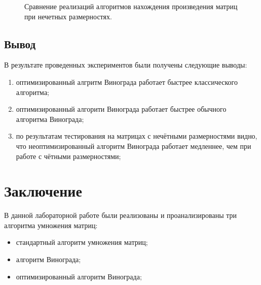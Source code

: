 \documentclass[a4paper]{article}
\begin{document}
	\begin{figure}[h]
	\caption{Сравнение реализаций алгоритмов нахождения произведения матриц при нечетных размерностях.\centering}
	\label{image2}
	\end{figure}
	\clearpage
	
	
	\subsection{Вывод}
	В результате проведенных экспериментов были получены следующие выводы:
	\begin{enumerate}
		\item оптимизированный алгритм Винограда работает быстрее классического алгоритма;
		\item оптимизированный алгорити Винограда работает быстрее обычного алгоритма Винограда;
		\item по результатам тестирования на матрицах с нечётными размерностями видно, что неоптимизированный алгоритм Винограда работает медленнее, чем при работе с чётными размерностями;
		
	\end{enumerate}
	\clearpage
	
	
	\section*{Заключение}
	В данной лабораторной работе были реализованы и проанализированы три алгоритма умножения матриц:
	\begin{itemize}
		\item стандартный алгоритм умножения матриц;
		\item алгоритм Винограда;
		\item оптимизированный алгоритм Винограда;
	\end{itemize}
\end{document}
